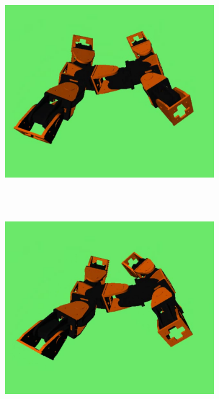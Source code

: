 \begin{figure}[h]
		\centering
        \begin{subfigure}[b]{0.25\textwidth}
                \centering
                \includegraphics[width=\textwidth]{images/results_11_gait_01.png}
                 \\~
        \end{subfigure}
        ~
        \begin{subfigure}[b]{0.25\textwidth}
                \centering
                \includegraphics[width=\textwidth]{images/results_11_gait_02.png}

\end{subfigure}
\end{figure}
